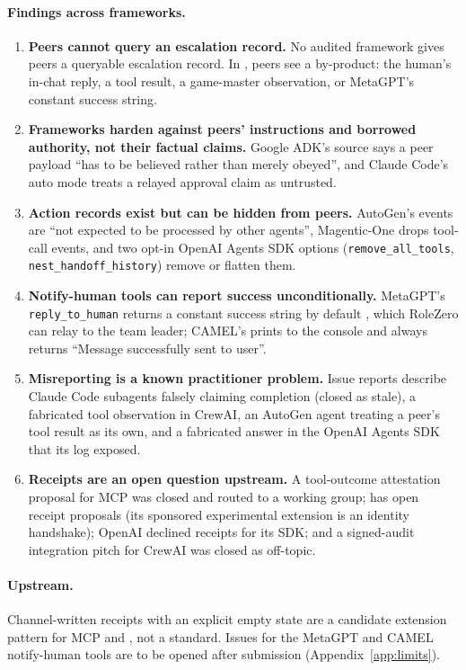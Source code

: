 \paragraph{Findings across frameworks.}
\begin{enumerate}\raggedright
\item \textbf{Peers cannot query an escalation record.} No audited framework gives peers a queryable escalation record. In \wtthAuditPartialVerifyWord, peers see a by-product: the human's in-chat reply, a tool result, a game-master observation, or MetaGPT's constant success string.
\item \textbf{Frameworks harden against peers' instructions and borrowed authority, not their factual claims.} Google ADK's source says a peer payload ``has to be believed rather than merely obeyed'', and Claude Code's auto mode treats a relayed approval claim as untrusted.
\item \textbf{Action records exist but can be hidden from peers.} AutoGen's events are ``not expected to be processed by other agents'', Magentic-One drops tool-call events, and two opt-in OpenAI Agents SDK options (\texttt{remove\_all\_tools}, \texttt{nest\_handoff\_history}) remove or flatten them.
\item \textbf{Notify-human tools can report success unconditionally.} MetaGPT's \texttt{reply\_to\_human} returns a constant success string by default \citep{metagptmgxenv}, which RoleZero can relay to the team leader; CAMEL's prints to the console and always returns ``Message successfully sent to user''.
\item \textbf{Misreporting is a known practitioner problem.} Issue reports describe Claude Code subagents falsely claiming completion (closed as stale), a fabricated tool observation in CrewAI, an AutoGen agent treating a peer's tool result as its own, and a fabricated answer in the OpenAI Agents SDK that its log exposed.
\item \textbf{Receipts are an open question upstream.} A tool-outcome attestation proposal for MCP was closed and routed to a working group; \AtwoA{} has open receipt proposals (its sponsored experimental extension is an identity handshake); OpenAI declined receipts for its SDK; and a signed-audit integration pitch for CrewAI was closed as off-topic.
\end{enumerate}

\paragraph{Upstream.}
Channel-written receipts with an explicit empty state are a candidate extension pattern for MCP and \AtwoA{}, not a standard.
Issues for the MetaGPT and CAMEL notify-human tools are to be opened after submission (Appendix~\ref{app:limits}).
